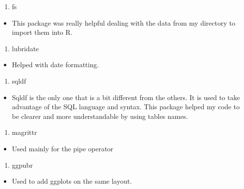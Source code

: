 \documentclass[
]{article}
\providecommand{\tightlist}{%
  \setlength{\itemsep}{0pt}\setlength{\parskip}{0pt}}
\begin{document}
\begin{enumerate}
\def\labelenumi{\arabic{enumi}.}
\setcounter{enumi}{3}
\tightlist
\item
  fs
\end{enumerate}

\begin{itemize}
\tightlist
\item
  This package was really helpful dealing with the data from my
  directory to import them into R.
\end{itemize}

\begin{enumerate}
\def\labelenumi{\arabic{enumi}.}
\setcounter{enumi}{4}
\tightlist
\item
  lubridate
\end{enumerate}

\begin{itemize}
\tightlist
\item
  Helped with date formatting.
\end{itemize}

\begin{enumerate}
\def\labelenumi{\arabic{enumi}.}
\setcounter{enumi}{5}
\tightlist
\item
  sqldf
\end{enumerate}

\begin{itemize}
\tightlist
\item
  Sqldf is the only one that is a bit different from the others. It is
  used to take advantage of the SQL language and syntax. This package
  helped my code to be clearer and more understandable by using tables
  names.
\end{itemize}

\begin{enumerate}
\def\labelenumi{\arabic{enumi}.}
\setcounter{enumi}{6}
\tightlist
\item
  magrittr
\end{enumerate}

\begin{itemize}
\tightlist
\item
  Used mainly for the pipe operator
\end{itemize}

\begin{enumerate}
\def\labelenumi{\arabic{enumi}.}
\setcounter{enumi}{7}
\tightlist
\item
  ggpubr
\end{enumerate}

\begin{itemize}
\tightlist
\item
  Used to add ggplots on the same layout.
\end{itemize}
\end{document}
